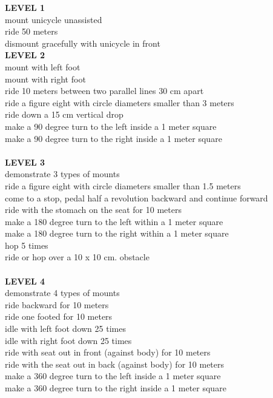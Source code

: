 \textbf{LEVEL 1}\\
mount unicycle unassisted\\
ride 50 meters\\
dismount gracefully with unicycle in front\\
\textbf{LEVEL 2}\\
mount with left foot\\
mount with right foot\\
ride 10 meters between two parallel lines 30 cm apart\\
ride a figure eight with circle diameters smaller than 3 meters\\
ride down a 15 cm vertical drop\\
make a 90 degree turn to the left inside a 1 meter square\\
make a 90 degree turn to the right inside a 1 meter square\\\\
\textbf{LEVEL 3}\\
demonstrate 3 types of mounts\\
ride a figure eight with circle diameters smaller than 1.5 meters\\
come to a stop, pedal half a revolution backward and continue forward\\
ride with the stomach on the seat for 10 meters\\
make a 180 degree turn to the left within a 1 meter square\\
make a 180 degree turn to the right within a 1 meter square\\
hop 5 times\\
ride or hop over a 10 x 10 cm. obstacle\\\\
\textbf{LEVEL 4}\\
demonstrate 4 types of mounts\\
ride backward for 10 meters\\
ride one footed for 10 meters\\
idle with left foot down 25 times\\
idle with right foot down 25 times\\
ride with seat out in front (against body) for 10 meters\\
ride with the seat out in back (against body) for 10 meters\\
make a 360 degree turn to the left inside a 1 meter square\\
make a 360 degree turn to the right inside a 1 meter square\\\\
